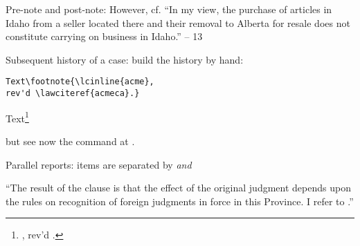 
\p Pre-note and post-note: 
{However, cf. ``In my view, the purchase of articles in Idaho from a seller located there and their removal to Alberta for resale does not constitute carrying on business in Idaho.'' -- }{13}

\p Subsequent history of a case: build the history by hand:

\begin{magpar}
\begin{verbatim}
Text\footnote{\lcinline{acme}, 
rev'd \lawciteref{acmeca}.}
\end{verbatim}
\end{magpar}

\begin{myquotation}
Text\footnote{, rev'd .}
\end{myquotation}

but see now the  command at .


\p Parallel reports: items are separated by \textit{and}

\begin{myquotation}
``The result of the clause is that the effect of the original judgment depends upon the rules on recognition of foreign judgments in force in this Province. I refer to  .''
\end{myquotation}


\citetrackerfalse
{}
\citetrackertrue


